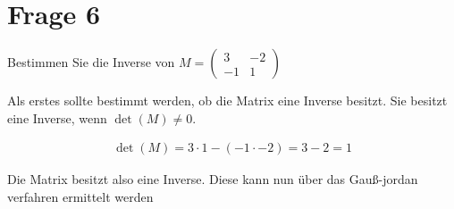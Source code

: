 \section{Frage 6}

Bestimmen Sie die Inverse von $M = \begin{pmatrix}
        3 & -2 \\ -1 & 1
    \end{pmatrix}$

Als erstes sollte bestimmt werden, ob die Matrix eine Inverse besitzt. Sie
besitzt eine Inverse, wenn $\det(M) \neq 0$.

\begin{align*}
    \det(M) = 3 \cdot 1 - (-1 \cdot -2) = 3 - 2 = 1
\end{align*}

Die Matrix besitzt also eine Inverse. Diese kann nun über das Gauß-jordan
verfahren ermittelt werden

